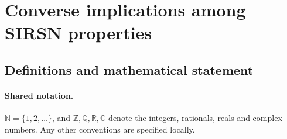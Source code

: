 \documentclass[11pt]{article}
\begin{document}
\section{Converse implications among SIRSN properties}\label{statement}

\subsection{Definitions and mathematical statement}

\paragraph{Shared notation.}$\mathbb N=\{1,2,\ldots\}$, and $\mathbb Z,\mathbb Q,\mathbb R,\mathbb C$ denote the integers, rationals, reals and complex numbers. Any other conventions are specified locally.
\end{document}
